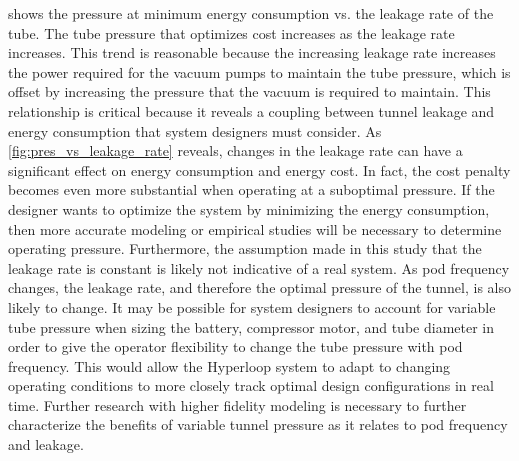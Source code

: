  shows the pressure at minimum energy
consumption vs. the leakage rate of the tube. The tube pressure that optimizes
cost increases as the leakage rate increases. This trend is reasonable because the
increasing leakage rate increases the power required for the vacuum pumps to
maintain the tube pressure, which is offset by increasing the pressure that the
vacuum is required to maintain. This relationship is critical because it
reveals a coupling between tunnel leakage and energy consumption that system
designers must consider. As \cref{fig:pres_vs_leakage_rate} reveals, changes
in the leakage rate can have a significant effect on energy consumption and energy cost.
In fact, the cost penalty becomes even more substantial when
operating at a suboptimal pressure. If the designer wants to optimize the
system by minimizing the energy consumption, then more accurate modeling or
empirical studies will be necessary to determine operating pressure.
Furthermore, the assumption made in this study that the leakage rate is constant is
likely not indicative of a real system. As pod frequency changes, the
leakage rate, and therefore the optimal pressure of the tunnel, is also likely to change.
It may be possible for system designers to account for variable tube pressure
when sizing the battery, compressor motor, and tube diameter in order to give
the operator flexibility to change the tube pressure with pod frequency.
This would allow the Hyperloop system to adapt to changing operating conditions
to more closely track optimal design configurations in real time.
Further research with higher fidelity modeling is necessary to further
characterize the benefits of variable tunnel pressure as it relates to pod frequency and leakage.

